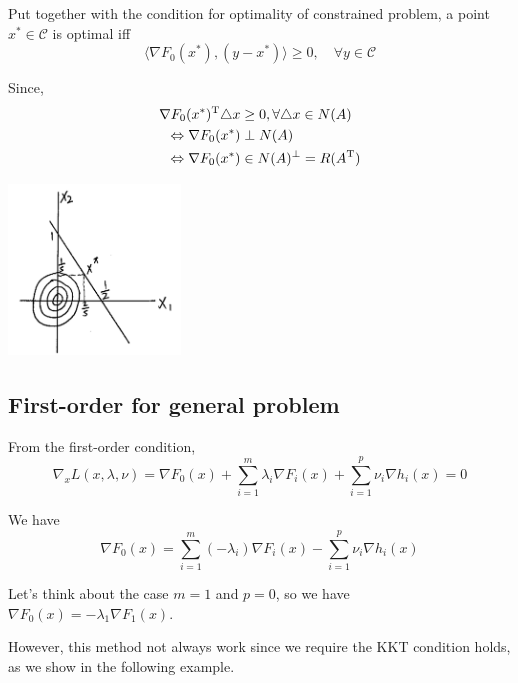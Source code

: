 Put together with the condition for optimality of constrained problem, a point $x^*\in\mathcal{C}$ is optimal iff 
$$\langle\nabla F_0(x^*), (y-x^*)\rangle\geq 0,\quad \forall y\in\mathcal{C}$$

Since,
\begin{align*}
\nabla F_0(x^*)^{{\rm T}} \triangle x &\geq 0, \forall \triangle x\in N(A)\\
\Leftrightarrow \nabla F_0(x^*) &\perp N(A)\\
\Leftrightarrow \nabla F_0(x^*) &\in N(A)^{\perp} = R(A^{{\rm T}})
\end{align*}






\begin{marginfigure}
	\centering
	\includegraphics[width=1.8in,height=1.8in]{figures/ch10/figure1204_4.png}
\end{marginfigure}



\subsection{First-order for general problem}
From the first-order condition,
$$\nabla_x L(x,\lambda,\nu) = \nabla F_0(x) + \sum^m_{i=1}\lambda_i\nabla F_i(x) + \sum^p_{i=1}\nu_i \nabla h_i(x) = 0$$

We have
$$\nabla F_0(x) = \sum^m_{i=1}(-\lambda_i)\nabla F_i(x) - \sum^p_{i=1}\nu_i\nabla h_i(x)$$

Let's think about the case $m=1$ and $p=0$, so we have $\nabla F_0(x)=-\lambda_1\nabla F_1(x)$.

However, this method not always work since we require the KKT condition holds, as we show in the following example.

